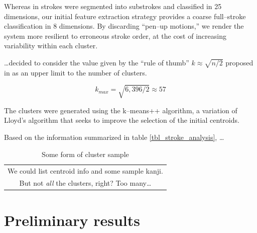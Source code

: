 \documentclass[10pt,conference,a4paper]{IEEEtran}
\begin{document}
	Whereas in \cite{nakai2001substroke} strokes were segmented into substrokes and classified in
	25 dimensions, our initial feature extraction strategy provides a coarse full--stroke classification
	in 8 dimensions. By discarding ``pen--up motions,'' we render the system more resilient to erroneous
	stroke order, at the cost of increasing variability within each cluster.


	\ldots decided to consider the value given by the ``rule of thumb'' $k \approx \sqrt{n / 2}$ proposed in \cite{mardia2005multivariate}
	as an upper limit to the number of clusters.

	$$ k_{max} = \sqrt{6,396 / 2} \approx 57 $$

	The clusters were generated using the k--means++ algorithm,
	a variation of Lloyd's algorithm that seeks to improve the selection of the initial centroids. \cite{arthur2007k}

	Based on the information summarized in table \ref{tbl_stroke_analysis}, \ldots

	\begin{table}
		\renewcommand{\arraystretch}{1.3}
		\caption{Some form of cluster sample}
		\label{tbl_sample_clusters}
		\centering
		\begin{tabular}{c}
			We could list centroid info and some sample kanji. \\
			But not \emph{all} the clusters, right? Too many\ldots \\
		\end{tabular}
	\end{table}




	\section{Preliminary results}
	\label{sec:experiment_results}
\end{document}
